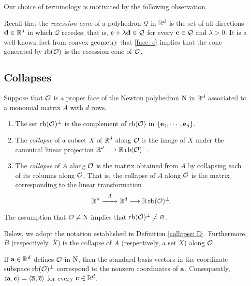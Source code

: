 \documentclass[11pt]{amsart}
\renewcommand{\!}[1]{{\color{red}\text{$\star$\,}#1\,$\star$}}
\newcommand{\ol}[1]{\overline{#1}}
\begin{document}
Our choice of terminology is motivated by the following observation.

\begin{remark}  Recall that the \emph{recession cone} of a polyhedron $\mathcal{Q}$ in $\mathbb{R}^d$ is the set of all directions $\mathbf{d} \in \mathbb{R}^d$ in which $\mathcal{Q}$ recedes, that is, $\mathbf{c} + \lambda \mathbf{d} \in \mathcal{Q}$ for every $\mathbf{c} \in \mathcal{Q}$ and $\lambda > 0$.  It is a well-known fact from convex geometry that  \eqref{face: e} implies that the cone generated by $\operatorname{rb}(\mathcal{O})$ is the recession cone of $\mathcal{O}$.
\end{remark}

\subsection{Collapses} 


\begin{definition}  
\label{collapse: D}
 Suppose that $\mathcal{O}$ is a proper face of the Newton polyhedron $\mathrm{N}$ in $\mathbb{R}^d$ associated to a monomial matrix $A$ with $d$ rows.  

\begin{enumerate}
\item The set $\operatorname{rb}(\mathcal{O})^{\perp}$ is the complement of $\operatorname{rb}(\mathcal{O})$ in $\{ \mathbf{e}_1, \cdots, \mathbf{e}_d \}$.
\item The \emph{collapse} of a subset $X$ of $\mathbb{R}^d$ along $\mathcal{O}$ is the image of $X$ under the canonical linear projection $\mathbb{R}^d \longrightarrow \mathbb{R} \operatorname{rb}(\mathcal{O})^{\perp}$.
\item The \emph{collapse} of $A$ along $\mathcal{O}$ is the matrix obtained from $A$ by collapsing each of its columns along $\mathcal{O}$.  That is, the collapse of $A$ along $\mathcal{O}$ is the matrix corresponding to the linear transformation  
%
\[ \mathbb{R}^n \stackrel{A}{\xrightarrow{\hspace*{6mm}}} \mathbb{R}^d \longrightarrow \mathbb{R} \operatorname{rb}(\mathcal{O})^{\perp}.\]  
%
\end{enumerate}
\end{definition}     

\begin{remark}  The assumption that $\mathcal{O} \neq \mathrm{N}$ implies that $\operatorname{rb}(\mathcal{O})^{\perp} \neq \varnothing$.
\end{remark}

Below, we adopt the notation established in Definition \ref{collapse: D}.  Furthermore,  $B$ (respectively, $\ol{X}$) is the collapse of $A$ (respectively, a set $X$) along $\mathcal{O}$.


\begin{remark}
\label{collapse of a defining vector: R}
If $\mathbf{a} \in \mathbb{R}^d$ defines $\mathcal{O}$ in $\mathrm{N}$, then the standard basis vectors in the coordinate subspace $\operatorname{rb}(\mathcal{O})^{\perp}$ correspond to the nonzero coordinates of $\mathbf{a}$.  Consequently, $\iprod{\vv{a}}{\vv{c}} = \iprod{\ol{\vv{a}}}{\ol{\vv{c}}}$ for every $\mathbf{c} \in \mathbb{R}^d$.
\end{remark}
\end{document}
